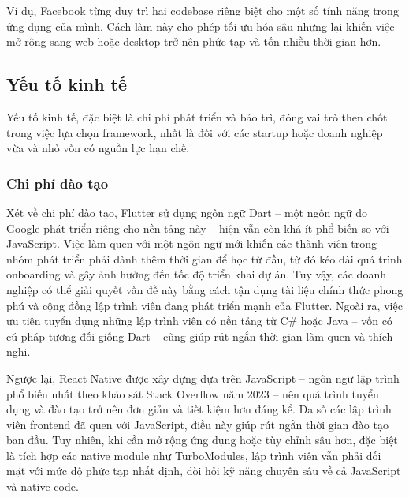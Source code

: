 \vspace{0.5em}

\indent Ví dụ, Facebook từng duy trì hai codebase riêng biệt cho một số tính năng trong ứng dụng của mình. Cách làm này cho phép tối ưu hóa sâu nhưng lại khiến việc mở rộng sang web hoặc desktop trở nên phức tạp và tốn nhiều thời gian hơn.



\subsection{Yếu tố kinh tế}


    Yếu tố kinh tế, đặc biệt là chi phí phát triển và bảo trì, đóng vai trò then chốt trong việc lựa chọn framework, nhất là đối với các startup hoặc doanh nghiệp vừa và nhỏ vốn có nguồn lực hạn chế.

\subsubsection{Chi phí đào tạo}


    Xét về chi phí đào tạo, Flutter sử dụng ngôn ngữ Dart – một ngôn ngữ do Google phát triển riêng cho nền tảng này – hiện vẫn còn khá ít phổ biến so với JavaScript. Việc làm quen với một ngôn ngữ mới khiến các thành viên trong nhóm phát triển phải dành thêm thời gian để học từ đầu, từ đó kéo dài quá trình onboarding và gây ảnh hưởng đến tốc độ triển khai dự án. Tuy vậy, các doanh nghiệp có thể giải quyết vấn đề này bằng cách tận dụng tài liệu chính thức phong phú và cộng đồng lập trình viên đang phát triển mạnh của Flutter. Ngoài ra, việc ưu tiên tuyển dụng những lập trình viên có nền tảng từ C\# hoặc Java – vốn có cú pháp tương đối giống Dart – cũng giúp rút ngắn thời gian làm quen và thích nghi.

    \vspace{0.5em}

    Ngược lại, React Native được xây dựng dựa trên JavaScript – ngôn ngữ lập trình phổ biến nhất theo khảo sát Stack Overflow năm 2023 \cite{muojsframeworks} – nên quá trình tuyển dụng và đào tạo trở nên đơn giản và tiết kiệm hơn đáng kể. Đa số các lập trình viên frontend đã quen với JavaScript, điều này giúp rút ngắn thời gian đào tạo ban đầu. Tuy nhiên, khi cần mở rộng ứng dụng hoặc tùy chỉnh sâu hơn, đặc biệt là tích hợp các native module như TurboModules, lập trình viên vẫn phải đối mặt với mức độ phức tạp nhất định, đòi hỏi kỹ năng chuyên sâu về cả JavaScript và native code.

